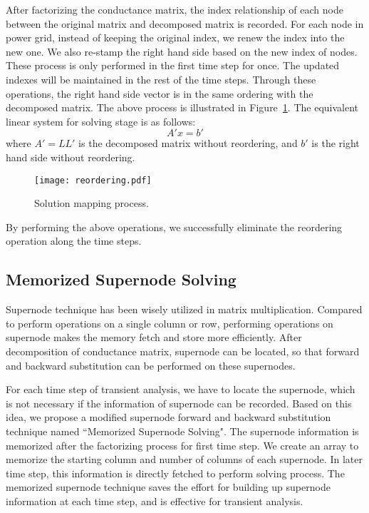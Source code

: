After factorizing the conductance matrix, the index relationship of each node between the original matrix and decomposed matrix is recorded. For each node in power grid, instead of keeping the original index, we renew the index into the new one. We also re-stamp the right hand side based on the new index of nodes. These process is only performed in the first time step for once. The updated indexes will be maintained in the rest of the time steps. Through these operations, the right hand side vector is
in the same ordering with the decomposed matrix. The above process is illustrated in Figure~\ref{reordering}. The equivalent linear system for solving stage is as follows:
\begin{equation}
A'x = b'
\end{equation}
where $A'=LL'$ is the decomposed matrix without reordering, and $b'$ is the right hand side without reordering.
\begin{figure}[htbp]
  \centering
  \texttt{[image: reordering.pdf]}
  \caption{Solution mapping process.}
  \label{reordering}
\end{figure}

By performing the above operations, we successfully eliminate the reordering operation along the time steps.

  \subsection{Memorized Supernode Solving}
Supernode technique has been wisely utilized in matrix multiplication. Compared to perform operations on a single column or row, performing operations on supernode makes the memory fetch and store more efficiently\cite{Selberherr}. After decomposition of conductance matrix, supernode can be located, so that forward and backward substitution can be performed on these supernodes. 

For each time step of transient analysis, we have to locate the supernode, which is not necessary if the information of supernode can be recorded. Based on this idea, we propose a modified supernode forward and backward substitution technique named ``Memorized Supernode Solving". The supernode information is memorized after the factorizing process for first time step. We create an array to memorize the starting column and number of columns of each supernode. In later time step,  this information is directly fetched to perform solving process. The memorized supernode technique saves the effort for building up supernode information at each time step, and is effective for transient analysis.  

